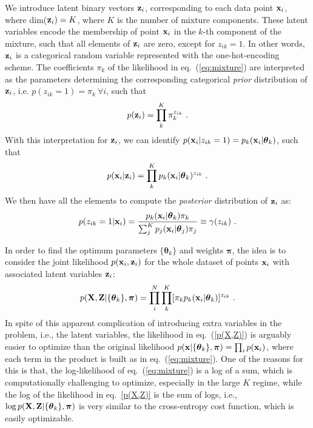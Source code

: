 \documentclass[12pt, a4paper]{article}
\newcommand{\bx}{{\bf x}}
\newcommand{\btheta}{\boldsymbol{\theta}}
\begin{document}
We introduce latent binary vectors ${\bf z}_i$, corresponding to each data point $\bx_i$, where dim(${\bf z}_i)=K$, where $K$ is the number of mixture components. These latent variables encode the membership of point $\bx_i$ in the $k$-th component of the mixture, such that all elements of ${\bf z}_i$ are zero, except for $z_{ik}=1$. In other words, ${\bf z}_i$ is a categorical random variable represented with the one-hot-encoding scheme. The coefficients $\pi_k$ of the likelihood in eq.~(\ref{eq:mixture}) are interpreted as the parameters determining the corresponding categorical {\it prior} distribution of ${\bf z}_i$, i.e. $p(z_{ik}=1)=\pi_k~\forall i$, such that  
\begin{equation}
 p({\bf z}_i) = \prod_k^K \pi_k^{z_{ik}} ~.  
\end{equation}
With this interpretation for ${\bf z}_i$, we can identify $ p(\bx_i | z_{ik}=1) = p_k(\bx_i|\btheta_k)$, such that
\begin{equation}
p(\bx_i|{\bf z}_i) = \prod_k^K p_k(\bx_i|\btheta_k)^{z_{ik}}~.
\end{equation}
We then have all the elements to compute the {\it posterior} distribution of ${\bf z}_i$ as:
\begin{equation}
p(z_{ik}=1 | \bx_i) = \frac{p_k(\bx_i|\btheta_k) \pi_k}
{\sum_j^K p_j(\bx_i|\btheta_j) \pi_j} \equiv \gamma(z_{ik})~.
\label{gamma}
\end{equation}

In order to find the optimum parameters $\{\btheta_k\}$ and weights $\boldsymbol{\pi}$, the idea is to consider the joint likelihood $p(\bx_i, {\bf z}_i)$ 
for the whole dataset of points $\bx_i$ with associated latent variables ${\bf z}_i$:
\begin{equation}
\label{p(X,Z)}
p({\bf X,Z}|\{\btheta_k\},\boldsymbol{\pi})
=\prod_i^N \prod_k^K [\pi_k p_k(\bx_i|\btheta_k)]^{z_{ik}}~.
\end{equation}
In spite of this apparent complication of introducing extra variables in the problem, i.e., the latent variables, the likelihood in eq.~(\ref{p(X,Z)}) is arguably easier to optimize than the original likelihood $p(\bx|\{\btheta_k\},\boldsymbol{\pi}) = \prod_i p(\bx_i)$, where each term in the product is built as in eq.~(\ref{eq:mixture}). One of the reasons for this is that, the log-likelihood of eq.~(\ref{eq:mixture}) is a log of a sum, which is computationally challenging to optimize, especially in the large $K$ regime, while the log of the likelihood in eq.~\ref{p(X,Z)} is the sum of logs, i.e., $\log p({\bf X,Z}|\{\btheta_k\},\boldsymbol{\pi})$ is very similar to the cross-entropy cost function, which is easily optimizable.  
\end{document}
